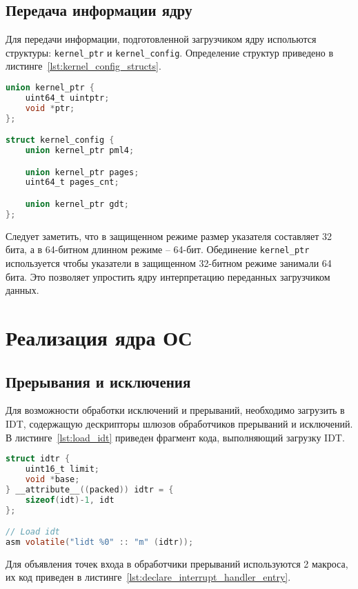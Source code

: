 \subsection{Передача информации ядру}
Для передачи информации, подготовленной загрузчиком ядру испольются структуры:
\texttt{kernel\_ptr} и \texttt{kernel\_config}. Определение структур приведено
в листинге~\ref{lst:kernel_config_structs}.

\begin{lstlisting}[language=C,
caption={Структуры для передачи информации ядру},
label={lst:kernel_config_structs}]
union kernel_ptr {
	uint64_t uintptr;
	void *ptr;
};

struct kernel_config {
	union kernel_ptr pml4;

	union kernel_ptr pages;
	uint64_t pages_cnt;

	union kernel_ptr gdt;
};
\end{lstlisting}

Следует заметить, что в защищенном режиме размер указателя составляет 32 бита, а
в 64-битном длинном режиме -- 64-бит. Обединение \texttt{kernel\_ptr} используется
чтобы указатели в защищенном 32-битном режиме занимали 64 бита. Это позволяет
упростить ядру интерпретацию переданных загрузчиком данных.

\section{Реализация ядра ОС}
\subsection{Прерывания и исключения}
Для возможности обработки исключений и прерываний, необходимо загрузить в IDT, содержащую
дескрипторы шлюзов обработчиков прерываний и исключений. В листинге~\ref{lst:load_idt}
приведен фрагмент кода, выполняющий загрузку IDT.

\begin{lstlisting}[language=C,
caption={Загрузка IDT},
label={lst:load_idt}]
struct idtr {
	uint16_t limit;
	void *base;
} __attribute__((packed)) idtr = {
	sizeof(idt)-1, idt
};

// Load idt
asm volatile("lidt %0" :: "m" (idtr));
\end{lstlisting}

Для объявления точек входа в обработчики прерываний используются 2 макроса, их
код приведен в листинге~\ref{lst:declare_interrupt_handler_entry}.

